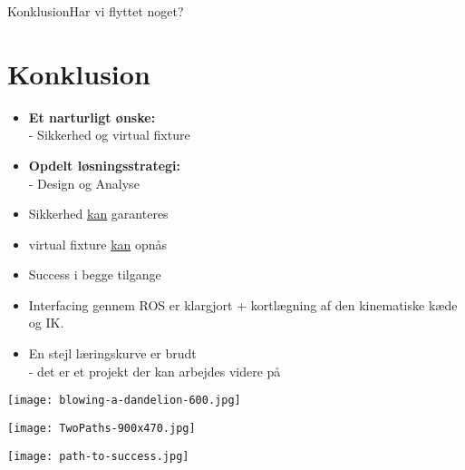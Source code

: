\begin{frame}{Konklusion}{Har vi flyttet noget?}
\section{Konklusion}
\begin{minipage}{0.6\textwidth}
\begin{block}{}
	\begin{itemize}
		\item \textbf{Et narturligt ønske:}\\ - Sikkerhed og virtual fixture
		\item \textbf{Opdelt løsningsstrategi:}\\ - Design og Analyse 
		\vspace{0.3cm}
		\item Sikkerhed \underline{kan} garanteres
		\item virtual fixture \underline{kan} opnås
		\item Success i begge tilgange
		\item Interfacing gennem ROS er klargjort + kortlægning af den kinematiske kæde og IK.
		\item En stejl læringskurve er brudt \\ - det er et projekt der kan arbejdes videre på
	\end{itemize}
\end{block}
\end{minipage}
\begin{minipage}{0.35\textwidth}
\texttt{[image: blowing-a-dandelion-600.jpg]}
\vspace*{0.2cm}

\texttt{[image: TwoPaths-900x470.jpg]}
\vspace*{0.2cm}

\texttt{[image: path-to-success.jpg]}
\end{minipage}
\end{frame}

